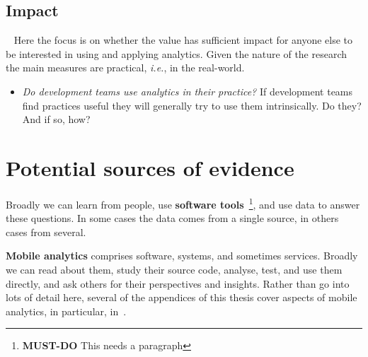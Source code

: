 \subsection{Impact}~\label{section-impact}
Here the focus is on whether the value has sufficient impact for anyone else to be interested in using and applying analytics. Given the nature of the research the main measures are practical, \emph{i.e.}, in the real-world.
\begin{itemize}
    \item \emph{Do development teams use analytics in their practice?} If development teams find practices useful they will generally try to use them intrinsically. Do they? And if so, how?

\end{itemize}


\section{Potential sources of evidence}





Broadly we can learn from people, use \textbf{software tools}~\footnote{\textbf{MUST-DO} This needs a paragraph}, and use data to answer these questions. In some cases the data comes from a single source, in others cases from several.



\textbf{Mobile analytics} comprises software, systems, and sometimes services. Broadly we can read about them, study their source code, analyse, test, and use them directly, and ask others for their perspectives and insights. Rather than go into lots of detail here, several of the appendices of this thesis cover aspects of mobile analytics, in particular, in~\href{app:on-mobile-analytics}{\emph{}}. 

